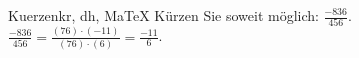 \begin{MAufgabe}{Kuerzen}{kr, dh, MaTeX}
K\"urzen Sie soweit m\"oglich: $\frac{-836}{456}$.\\ 
\ifLsg\MLoesung
\quad $\frac{-836}{456}=\frac{(76)\cdot(-11)}{(76)\cdot(6)}=\frac{-11}{6}$.\else\relax\fi
 \end{MAufgabe}